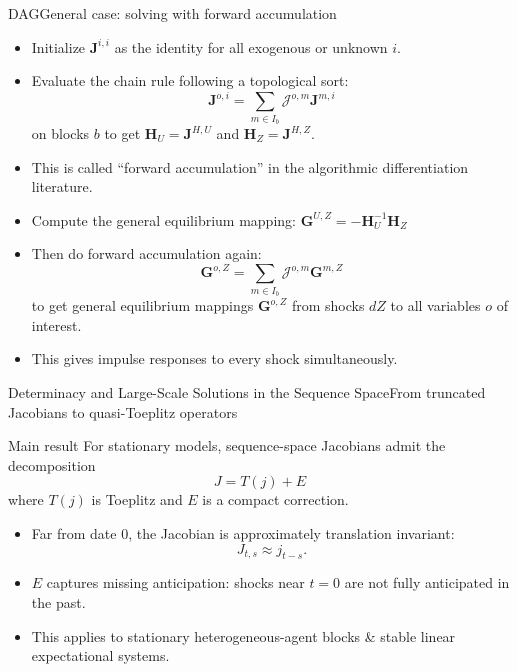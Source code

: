 \documentclass[aspectratio=169]{beamer}
\begin{document}
\begin{frame}{DAG}{General case: solving with forward accumulation}
    \begin{itemize}
        \item Initialize $\mathbf{J}^{i,i}$ as the identity for all exogenous or unknown $i$.
        \item Evaluate the chain rule following a topological sort:
              \[
                  \mathbf{J}^{o,i} = \sum_{m \in I_b} \mathcal{J}^{o,m} \mathbf{J}^{m,i}
              \]
              on blocks $b$ to get $\mathbf{H}_U = \mathbf{J}^{H,U}$ and $\mathbf{H}_Z = \mathbf{J}^{H,Z}$.
        \item This is called ``forward accumulation'' in the algorithmic differentiation literature.
        \item Compute the general equilibrium mapping:
              \(
              \mathbf{G}^{U,Z} = -\mathbf{H}_U^{-1} \mathbf{H}_Z
              \)
        \item Then do forward accumulation again:
              \[
                  \mathbf{G}^{o,Z} = \sum_{m \in I_b} \mathcal{J}^{o,m} \mathbf{G}^{m,Z}
              \]
              to get general equilibrium mappings $\mathbf{G}^{o,Z}$ from shocks $dZ$ to all variables $o$ of interest.
        \item This gives impulse responses to every shock simultaneously.
    \end{itemize}
\end{frame}



\begin{frame}{Determinacy and Large-Scale Solutions in the Sequence Space}{From truncated Jacobians to quasi-Toeplitz operators}
\small
\begin{block}{Main result}
For stationary models, sequence-space Jacobians admit the decomposition
\[
J = T(j) + E
\]
where $T(j)$ is Toeplitz and $E$ is a compact correction.
\end{block}

\begin{itemize}
    \item Far from date $0$, the Jacobian is approximately translation invariant:
    \[
    J_{t,s}\approx j_{t-s}.
    \]
    \item $E$ captures \alert{missing anticipation}: shocks near $t=0$ are not fully anticipated in the past.
    \item This applies to stationary heterogeneous-agent blocks \& stable linear expectational systems.
\end{itemize}

\end{frame}
\end{document}

